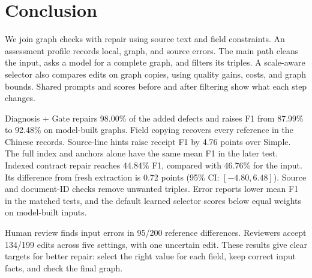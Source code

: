 \section{Conclusion}
\label{sec:conclusion}

We join graph checks with repair using source text and field constraints.
An assessment profile records local, graph, and source errors.
The main path cleans the input, asks a model for a complete graph, and filters
its triples. A scale-aware selector also compares edits on graph copies,
using quality gains, costs, and graph bounds.
Shared prompts and scores before and after filtering show what each step changes.

Diagnosis + Gate repairs 98.00\% of the added defects and raises F1 from
87.99\% to 92.48\% on model-built graphs. Field copying recovers every
reference in the Chinese records. Source-line hints raise receipt F1 by
4.76 points over Simple. The full index and anchors alone have the same
mean F1 in the later test. Indexed contract repair reaches 44.84\% F1,
compared with 46.76\% for the input. Its difference from fresh extraction
is 0.72 points (95\% CI: $[-4.80,6.48]$).
Source and document-ID checks remove unwanted triples.
Error reports lower mean F1 in the matched tests, and the default learned
selector scores below equal weights on model-built inputs.

Human review finds input errors in 95/200 reference differences.
Reviewers accept 134/199 edits across five settings, with one uncertain edit.
These results give clear targets for better repair: select the right value
for each field, keep correct input facts, and check the final graph.
